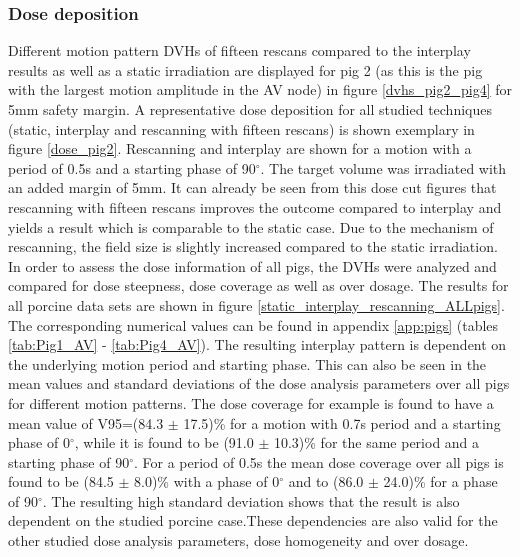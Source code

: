 \documentclass[type=dr, dr=rernat, accentcolor=tud7b,colorbacktitle, bigchapter, openright, twoside, 12pt ]{tudthesis}
\begin{document}
\subsubsection{Dose deposition}
Different motion pattern DVHs of fifteen rescans compared to the interplay results as well as a static irradiation are displayed for pig 2 
(as this is the pig with the largest motion amplitude in the AV node) in figure \ref{dvhs_pig2_pig4} for 5mm safety margin. 
A representative dose deposition for all studied techniques (static, interplay and rescanning with fifteen rescans) is shown exemplary in 
figure \ref{dose_pig2}. Rescanning and interplay are shown for a motion with a period of 0.5s and a starting phase of 90$^{\circ}$. The target 
volume was irradiated with an added margin of 5mm. It can already be seen from this dose cut figures that rescanning with fifteen rescans 
improves the outcome compared to interplay and yields a result which is comparable to the static case. Due to the mechanism of rescanning, the 
field size is slightly increased compared to the static irradiation.\newline
\newline
In order to assess the dose information of all pigs, the DVHs were analyzed and compared for dose steepness, dose coverage as well as over 
dosage. The results for all porcine data sets are shown in figure \ref{static_interplay_rescanning_ALLpigs}. The corresponding numerical 
values can be found in appendix \ref{app:pigs} (tables \ref{tab:Pig1_AV} - \ref{tab:Pig4_AV}).\newline
\newpage
The resulting interplay pattern is dependent on the underlying motion period and starting phase. This can also be seen in the mean values and 
standard deviations of the dose analysis parameters over all pigs  for different motion patterns. The dose coverage for example is found to 
have a mean value of V95=(84.3 $\pm$ 17.5)\% for a motion with 0.7s period and a starting phase of 0$^{\circ}$, while it is found to be (91.0 
$\pm$ 10.3)\% for the same period and a starting phase of 90$^{\circ}$. For a period of 0.5s the mean dose coverage over all pigs is found to 
be (84.5 $\pm$ 8.0)\% with a phase of 0$^{\circ}$ and to (86.0 $\pm$ 24.0)\% for a phase of 90$^{\circ}$. The resulting high standard deviation 
shows that the result is also dependent on the studied porcine case.These dependencies are also valid for the other studied dose analysis 
parameters, dose homogeneity and over dosage.\newline
\newline
\end{document}
